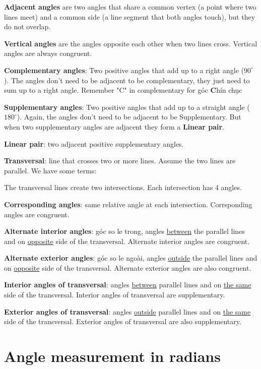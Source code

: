 \textbf{Adjacent angles} are two angles that share a common vertex (a point where two lines meet) and a common side (a line segment that both angles touch), but they do not overlap.

\textbf{Vertical angles} are the angles opposite each other when two lines cross. Vertical angles are always congruent.

\textbf{Complementary angles}: Two positive angles that add up to a right angle ($90^{\circ}$). The angles don't need to be adjacent to be complementary, they just need to sum up to a right angle. Remember "C" in complementary for góc \textbf{C}hín chục

\textbf{Supplementary angles}: Two positive angles that add up to a straight angle ($180^{\circ}$). Again, the angles don't need to be adjacent to be Supplementary. But when two supplementary angles are adjacent they form a \textbf{Linear pair}.

\textbf{Linear pair}: two adjacent positive supplementary angles.

\textbf{Transversal}: line that crosses two or more lines. Assume the two lines are parallel. We have some terms:

The transversal lines create two intersections. Each intersection has 4 angles.

\textbf{Corresponding angles}: same relative angle at each intersection. Corrsponding angles are congruent.

\textbf{Alternate interior angles}: góc so le trong, angles \underline{between} the parallel lines and on \underline{opposite} side of the transversal. Alternate interior angles are congruent.

\textbf{Alternate exterior angles}: góc so le ngoài, angles \underline{outside} the parallel lines and on \underline{opposite} side of the transversal. Alternate exterior angles are also congruent.

\textbf{Interior angles of transversal}: angles \underline{between} parallel lines and on \underline{the same} side of the transversal. Interior angles of transversal are supplementary.

\textbf{Exterior angles of transversal}: angles \underline{outside} parallel lines and on \underline{the same} side of the transversal. Exterior angles of transversal are also supplementary.

\section{Angle measurement in radians}

